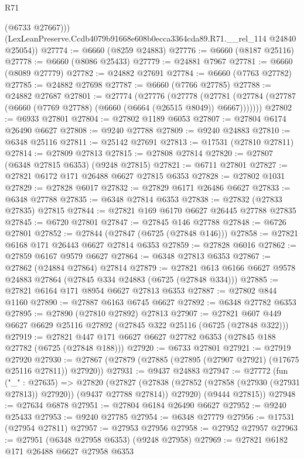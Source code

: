 \begin{lexlean}{R71}
\begin{coremodule}
          (@6733 @27667)))
      (LexLeanPreserve.Ccdb4079b91668e608b0ecca3364cda89.R71.__rel_114 @24840 @25054))
@27774 := @6660 (@8259 @24883)
@27776 := @6660 (@8187 @25116)
@27778 := @6660 (@8086 @25433)
@27779 := @24881 @7967
@27781 := @6660 (@8089 @27779)
@27782 := @24882 @27691
@27784 := @6660 (@7763 @27782)
@27785 := @24882 @27698
@27787 := @6660 (@7766 @27785)
@27788 := @24882 @27687
@27801 := @27774
    (@27776
      (@27778
        (@27781 (@27784 (@27787 (@6660 (@7769 @27788) (@6660 (@6664 (@26515 @8049)) @6667)))))))
@27802 := @6933 @27801
@27804 := @27802 @1189 @6053
@27807 := @27804 @6174 @26490 @6627
@27808 := @9240 @27788
@27809 := @9240 @24883
@27810 := @6348 @25116
@27811 := @25142 @27691
@27813 := @17531 (@27810 @27811)
@27814 := @27809 @27813
@27815 := @27808 @27814
@27820 := @27807 (@6348 @27815 @6353) (@9248 @27815)
@27821 := @6711 @27801
@27827 := @27821 @6172 @171 @26488 @6627 @27815 @6353
@27828 := @27802 @1031
@27829 := @27828 @6017
@27832 := @27829 @6171 @26486 @6627
@27833 := @6348 @27788
@27835 := @6348 @27814 @6353
@27838 := @27832 (@27833 @27835) @27815
@27844 := @27821 @169 @6170 @6627 @26445 @27788 @27835
@27845 := @6720 @27801
@27847 := @27845 @146 @27788
@27848 := @6726 @27801
@27852 := @27844 (@27847 (@6725 (@27848 @146)))
@27858 := @27821 @6168 @171 @26443 @6627 @27814 @6353
@27859 := @27828 @6016
@27862 := @27859 @6167 @9579 @6627
@27864 := @6348 @27813 @6353
@27867 := @27862 (@24884 @27864) @27814
@27879 := @27821 @613 @6166 @6627 @9578 @24883 @27864 (@27845 @334 @24883 (@6725 (@27848 @334)))
@27885 := @27821 @6164 @171 @8954 @6627 @27813 @6353
@27887 := @27802 @844 @1160
@27890 := @27887 @6163 @6745 @6627
@27892 := @6348 @27782 @6353
@27895 := @27890 (@27810 @27892) @27813
@27907 := @27821 @607 @449 @6627 @6629 @25116 @27892 (@27845 @322 @25116 (@6725 (@27848 @322)))
@27919 := @27821 @447 @171 @6627 @6627 @27782 @6353 (@27845 @188 @27782 (@6725 (@27848 @188)))
@27920 := @6733 @27801
@27921 := @27919 @27920
@27930 := @27867 (@27879 (@27885 (@27895 (@27907 @27921) (@17675 @25116 @27811)) @27920))
@27931 := @9437 @24883
@27947 := @27772
    (fun ("_" : @27635) =>
    @27820
      (@27827
        (@27838 (@27852 (@27858 (@27930 (@27931 @27813)) @27920)) (@9437 @27788 @27814))
        @27920)
      (@9444 @27815))
@27948 := @27634 @6878
@27951 := @27804 @6184 @26490 @6627
@27952 := @9240 @25433
@27953 := @9240 @27785
@27954 := @6348 @27779
@27956 := @17531 (@27954 @27811)
@27957 := @27953 @27956
@27958 := @27952 @27957
@27963 := @27951 (@6348 @27958 @6353) (@9248 @27958)
@27969 := @27821 @6182 @171 @26488 @6627 @27958 @6353

\end{coremodule}
\end{lexlean}
